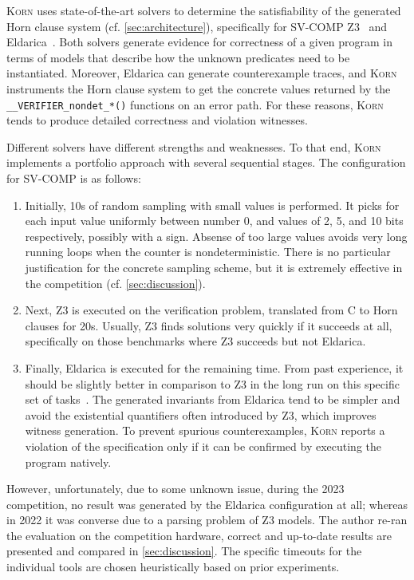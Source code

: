 \documentclass{llncs}
\newcommand{\Korn}{\textsc{Korn}\xspace}
\begin{document}
\Korn uses state-of-the-art solvers to determine the satisfiability of the generated Horn clause system (cf. \cref{sec:architecture}),
specifically for SV-COMP Z3~\cite{bjorner2013solving} and Eldarica~\cite{hojjat2018eldarica}.
Both solvers generate evidence for correctness of a given program in terms of models that describe how the unknown predicates need to be instantiated.
Moreover, Eldarica can generate counterexample traces, and \Korn instruments the Horn clause system to get
the concrete values returned by the \texttt{\_\_VERIFIER\_nondet\_*()} functions on an error path.
For these reasons, \Korn tends to produce detailed correctness and violation witnesses.

Different solvers have different strengths and weaknesses.
To that end, \Korn implements a portfolio approach with several sequential stages.
The configuration for SV-COMP is as follows:
\begin{enumerate}
    \item Initially, 10s of random sampling with small values is performed.
          It picks for each input value uniformly between number 0, and values of 2, 5, and 10 bits respectively, possibly with a sign.
          Absense of too large values avoids very long running loops
          when the counter is nondeterministic.
          There is no particular justification for the concrete sampling scheme,
          but it is extremely effective in the competition (cf. \cref{sec:discussion}).
    \item Next, Z3 is executed on the verification problem, translated from C to Horn clauses for 20s. Usually, Z3 finds solutions very quickly if it succeeds at all,
          specifically on those benchmarks where Z3 succeeds but not Eldarica.
    \item Finally, Eldarica is executed for the remaining time.
          From past experience, it should be slightly better in comparison to Z3 in the long run on this specific set of tasks~\cite{ernst:arxiv2020:summaries}.
    The generated invariants from Eldarica tend to be simpler and avoid the existential quantifiers
    often introduced by Z3, which improves witness generation.
    To prevent spurious counterexamples,
    \Korn reports a violation of the specification only if it can be confirmed by executing the program natively.
\end{enumerate}
However, unfortunately, due to some unknown issue, during the 2023 competition,
no result was generated by the Eldarica configuration at all;
whereas in 2022 it was converse due to a parsing problem of Z3 models.
The author re-ran the evaluation on the competition hardware,
correct and up-to-date results are presented and compared in \cref{sec:discussion}.
The specific timeouts for the individual tools are chosen heuristically based
on prior experiments.
\end{document}
